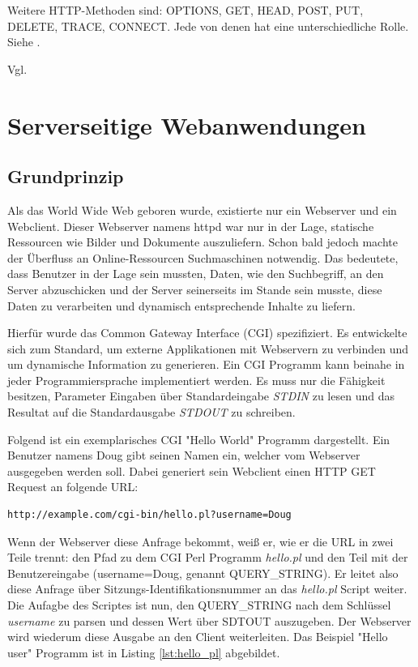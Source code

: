 Weitere HTTP-Methoden sind: OPTIONS, GET, HEAD, POST, PUT, DELETE, TRACE, CONNECT.
Jede von denen hat eine unterschiedliche Rolle. Siehe \cite[Kap. 4]{Fielding:2014}.

Vgl. \cite{Dubost:2012}

\section{Serverseitige Webanwendungen}

\subsection{Grundprinzip}

Als das World Wide Web geboren wurde, existierte nur ein Webserver und ein Webclient. Dieser Webserver namens httpd war nur in der Lage, statische Ressourcen wie Bilder und Dokumente auszuliefern. Schon bald jedoch machte der Überfluss an Online-Ressourcen Suchmaschinen notwendig. Das bedeutete, dass Benutzer in der Lage sein mussten, Daten, wie den Suchbegriff, an den Server abzuschicken und der Server seinerseits im Stande sein musste, diese Daten zu verarbeiten und dynamisch entsprechende Inhalte zu liefern.

Hierfür wurde das Common Gateway Interface (CGI) spezifiziert. Es entwickelte sich zum Standard, um externe Applikationen mit Webservern zu verbinden und um dynamische Information zu generieren. Ein CGI Programm kann beinahe in jeder Programmiersprache implementiert werden. Es muss nur die Fähigkeit besitzen, Parameter Eingaben über Standardeingabe \textit{STDIN} zu lesen und das Resultat auf die Standardausgabe  \textit{STDOUT} zu schreiben.

Folgend ist ein exemplarisches CGI "Hello World" Programm dargestellt. Ein Benutzer namens Doug gibt seinen Namen ein, welcher vom Webserver ausgegeben werden soll. Dabei generiert sein Webclient einen HTTP GET Request an folgende URL:

\begin{verbatim}
http://example.com/cgi-bin/hello.pl?username=Doug
\end{verbatim}

Wenn der Webserver diese Anfrage bekommt, weiß er, wie er die URL in zwei Teile trennt: den Pfad zu dem CGI Perl Programm \emph{hello.pl} und den Teil mit der Benutzereingabe (username=Doug, genannt QUERY\_STRING). Er leitet also diese Anfrage über Sitzungs-Identifikationsnummer an das \emph{hello.pl} Script weiter. Die Aufagbe des Scriptes ist nun, den QUERY\_STRING nach dem Schlüssel \emph{username} zu parsen und dessen Wert über SDTOUT auszugeben. Der Webserver wird wiederum diese Ausgabe an den Client weiterleiten. Das Beispiel "Hello user" Programm ist in Listing \ref{lst:hello_pl} abgebildet.

